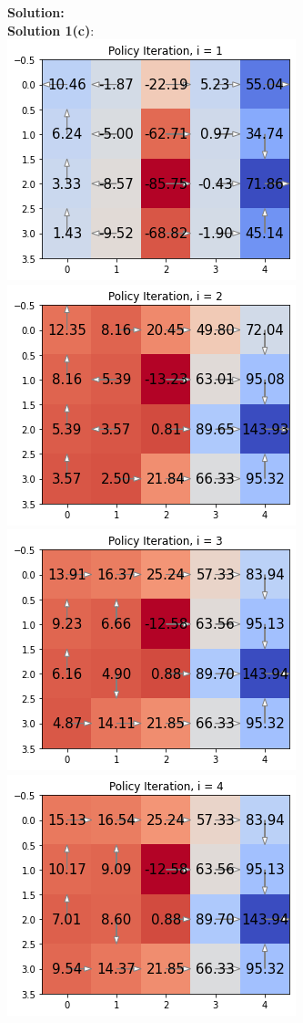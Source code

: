 \documentclass[submit]{harvardml}
\begin{document}
\newpage
\textbf{Solution:}\\
\textbf{Solution 1(c)}:\\
\includegraphics[width=0.5\linewidth]{HW6/plots/1c.1.png}
\includegraphics[width=0.5\linewidth]{HW6/plots/1c.2.png}
\includegraphics[width=0.5\linewidth]{HW6/plots/1c.3.png}
\includegraphics[width=0.5\linewidth]{HW6/plots/1c.4.png}
\newpage
\end{document}

